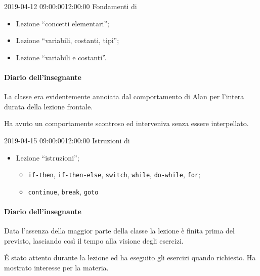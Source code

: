 \documentclass{tufte-book}
\begin{document}
\begin{lezione}
	{2019-04-12}
	{09:00:00}{12:00:00}
	{Fondamenti di \Cpp}

\begin{itemize}
	\item Lezione ``concetti elementari'';
	\item Lezione ``variabili, costanti, tipi'';
	\item Lezione ``variabili e costanti''.
\end{itemize}

\paragraph{Diario dell'insegnante}

La classe era evidentemente annoiata dal comportamento di Alan per l'intera durata della lezione frontale.

Ha avuto un comportamente scontroso ed interveniva senza essere interpellato.

\end{lezione}

\begin{lezione}
	{2019-04-15}
	{09:00:00}{12:00:00}
	{Istruzioni di \Cpp}

\begin{itemize}
	\item Lezione ``istruzioni'';
	\begin{itemize}
		\item \texttt{if-then}, \texttt{if-then-else}, \texttt{switch}, \texttt{while}, \texttt{do-while}, \texttt{for};
		\item \texttt{continue}, \texttt{break}, \texttt{goto}
	\end{itemize}
\end{itemize}

\paragraph{Diario dell'insegnante}
Data l'assenza della maggior parte della classe la lezione è finita prima del previsto, lasciando così il tempo alla visione degli esercizi.

\'E stato attento durante la lezione ed ha eseguito gli esercizi quando richiesto.
Ha mostrato interesse per la materia.

\end{lezione}
\end{document}
